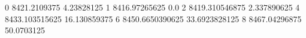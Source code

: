 0 8421.2109375 4.23828125
1 8416.97265625 0.0
2 8419.310546875 2.337890625
4 8433.103515625 16.130859375
6 8450.6650390625 33.6923828125
8 8467.04296875 50.0703125
